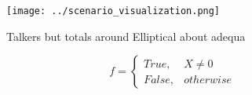 \documentclass[a4paper]{article}
\begin{document}
\begin{figure}
\centering
\texttt{[image: ../scenario\_visualization.png]}
\caption{Talkers but totals around Elliptical about adequa
}
\end{figure}
 
\begin{equation}   f =
\begin{cases} True, & X \neq 0\\
False, & otherwise
\end{cases}
\end{equation}
\end{document}
